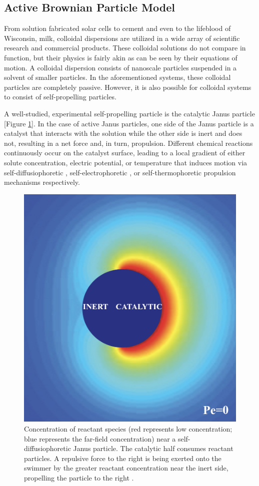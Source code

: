 \documentclass[11pt]{article}
\begin{document}
\subsection{Active Brownian Particle Model}\label{ABPsyo}

From solution fabricated solar cells to cement and even to the lifeblood of Wisconsin, milk, colloidal dispersions are utilized in a wide array of scientific research and commercial products.  These colloidal solutions do not compare in function, but their physics is fairly akin as can be seen by their equations of motion.  A colloidal dispersion consists of nanoscale particles suspended in a solvent of smaller particles. In the aforementioned systems, these colloidal particles are completely passive.  However, it is also possible for colloidal systems to consist of self-propelling particles. 

A well-studied, experimental self-propelling particle is the catalytic Janus particle [Figure \ref{fig:janus}]. In the case of active Janus particles, one side of the Janus particle is a catalyst that interacts with the solution while the other side is inert and does not, resulting in a net force and, in turn, propulsion.  Different chemical reactions continuously occur on the catalyst surface, leading to a local gradient of either solute concentration, electric potential, or temperature that induces motion via self-diffusiophoretic \cite{Howse, Golestanian, Popescu}, self-electrophoretic \cite{Moran, Moran2, Ebbens, Brown, Brown2}, or self-thermophoretic \cite{Yang, Jiang, Samin} propulsion mechanisms respectively.   

\begin{figure}[ht]
\centering\includegraphics[width=0.5\linewidth]{Screen Shot 2020-08-05 at 8.17.05 PM2.png}
\caption{ Concentration of reactant species (red represents low concentration; blue represents the far-field concentration) near a self-diffusiophoretic Janus particle. The catalytic half consumes reactant particles. A repulsive force to the right is being exerted onto the swimmer by the greater reactant concentration near the inert side, propelling the particle to the right \cite{Moran}.}
\label{fig:janus}
\end{figure}
\end{document}

